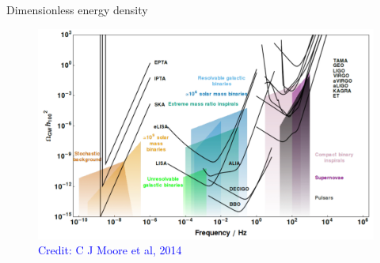 \documentclass[pdf]{beamer}
\newcommand{\credit}[1]{\tiny{\textcolor{blue}{Credit: #1}}}
\begin{document}
\begin{frame}{Dimensionless energy density}
\begin{figure}
\includegraphics[scale=.2]{fig/Energy-TOT.png}
\caption*{\credit{C J Moore et al, 2014}}
\end{figure}
\end{frame}
\end{document}
